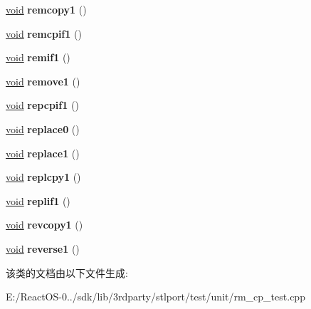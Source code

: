 \begin{DoxyCompactItemize}
\item 
\mbox{\label{class_rm_cp_test_a8e32c180401c7b5c05ede910a96e8a61}} 
\hyperlink{interfacevoid}{void} {\bfseries remcopy1} ()
\item 
\mbox{\label{class_rm_cp_test_a299abe9c26325ed27302d28df627b2fa}} 
\hyperlink{interfacevoid}{void} {\bfseries remcpif1} ()
\item 
\mbox{\label{class_rm_cp_test_a69c80bac8cbeb4867c43287054b06555}} 
\hyperlink{interfacevoid}{void} {\bfseries remif1} ()
\item 
\mbox{\label{class_rm_cp_test_a78d6ea27616cc0ad1cc662b31782bbc4}} 
\hyperlink{interfacevoid}{void} {\bfseries remove1} ()
\item 
\mbox{\label{class_rm_cp_test_aae0faf0250fa1e8251878abdbf1489c7}} 
\hyperlink{interfacevoid}{void} {\bfseries repcpif1} ()
\item 
\mbox{\label{class_rm_cp_test_a21470c58d6608c400186a4aff5337217}} 
\hyperlink{interfacevoid}{void} {\bfseries replace0} ()
\item 
\mbox{\label{class_rm_cp_test_abe35a51d5f1ef44d61faed2861d872fb}} 
\hyperlink{interfacevoid}{void} {\bfseries replace1} ()
\item 
\mbox{\label{class_rm_cp_test_a17b8a7c699f00b6f6893d8517029754d}} 
\hyperlink{interfacevoid}{void} {\bfseries replcpy1} ()
\item 
\mbox{\label{class_rm_cp_test_a5f37c756c4354e8e4daa2bb4a9030c23}} 
\hyperlink{interfacevoid}{void} {\bfseries replif1} ()
\item 
\mbox{\label{class_rm_cp_test_a5313130151119e3c6d66221a7b2273d2}} 
\hyperlink{interfacevoid}{void} {\bfseries revcopy1} ()
\item 
\mbox{\label{class_rm_cp_test_a2f9bea502ac6b3343b5761b1f3544cac}} 
\hyperlink{interfacevoid}{void} {\bfseries reverse1} ()
\end{DoxyCompactItemize}


该类的文档由以下文件生成\+:\begin{DoxyCompactItemize}
\item 
E\+:/\+React\+O\+S-\/0../sdk/lib/3rdparty/stlport/test/unit/rm\+\_\+cp\+\_\+test.\+cpp\end{DoxyCompactItemize}
